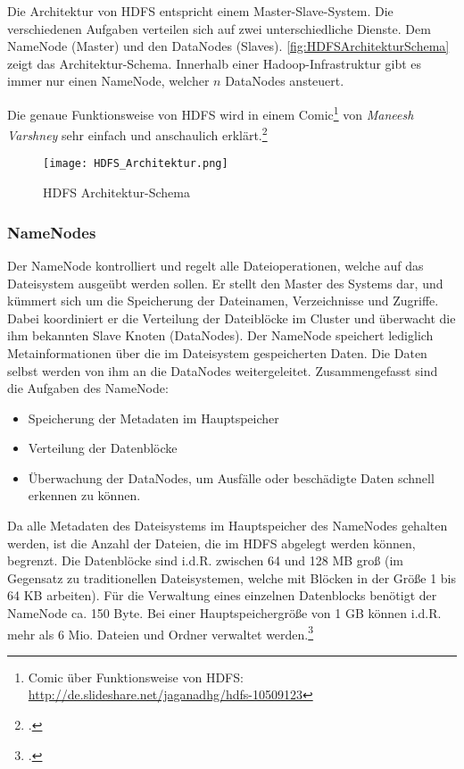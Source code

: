 Die Architektur von \ac{HDFS} entspricht einem Master-Slave-System. Die verschiedenen Aufgaben verteilen sich auf zwei unterschiedliche Dienste. Dem NameNode (Master) und den DataNodes (Slaves). \autoref{fig:HDFSArchitekturSchema} zeigt das Architektur-Schema. Innerhalb einer Hadoop-Infrastruktur gibt es immer nur einen NameNode, welcher $n$ DataNodes ansteuert.

Die genaue Funktionsweise von \ac{HDFS} wird in einem Comic\footnote{Comic über Funktionsweise von HDFS: \\ \url{http://de.slideshare.net/jaganadhg/hdfs-10509123}} von \textit{Maneesh Varshney} sehr einfach und anschaulich erklärt.\footcite[Vgl.][S. 22 f.]{Wartala.2012}

\newpage
\begin{figure}[h]
	\centering
	\texttt{[image: HDFS\_Architektur.png]}
	\caption{HDFS Architektur-Schema\footnotemark}
	\label{fig:HDFSArchitekturSchema}
\end{figure}

\subsubsection{NameNodes}
Der NameNode kontrolliert und regelt alle Dateioperationen, welche auf das Dateisystem ausgeübt werden sollen. Er stellt den Master des Systems dar, und kümmert sich um die Speicherung der Dateinamen, Verzeichnisse und Zugriffe. Dabei koordiniert er die Verteilung der Dateiblöcke im Cluster und überwacht die ihm bekannten Slave Knoten (DataNodes). Der NameNode speichert lediglich Metainformationen über die im Dateisystem gespeicherten Daten. Die Daten selbst werden von ihm an die DataNodes weitergeleitet. Zusammengefasst sind die Aufgaben des NameNode:

\begin{itemize}
	\item Speicherung der Metadaten im Hauptspeicher
	\item Verteilung der Datenblöcke
	\item Überwachung der DataNodes, um Ausfälle oder beschädigte Daten schnell erkennen zu können.
\end{itemize}

Da alle Metadaten des Dateisystems im Hauptspeicher des NameNodes gehalten werden, ist die Anzahl der Dateien, die im \ac{HDFS} abgelegt werden können, begrenzt. Die Datenblöcke sind i.d.R. zwischen 64 und 128 \ac{MB} groß (im Gegensatz zu traditionellen Dateisystemen, welche mit Blöcken in der Größe 1 bis 64 \ac{KB} arbeiten). Für die Verwaltung eines einzelnen Datenblocks benötigt der NameNode ca. 150 Byte. Bei einer Hauptspeichergröße von 1 \ac{GB} können i.d.R. mehr als 6 Mio. Dateien und Ordner verwaltet werden.\footcite[Vgl.][S. 24]{Wartala.2012}

